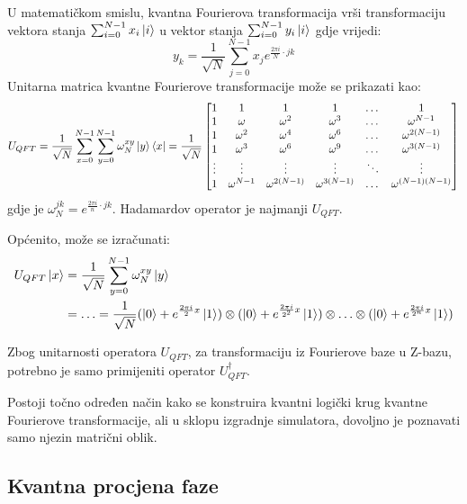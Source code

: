 U matematičkom smislu, kvantna Fourierova transformacija vrši transformaciju vektora stanja $\sum_{i=0}^{N-1}x_i\ket{i}$ u vektor stanja $\sum_{i=0}^{N-1}y_i\ket{i}$ gdje vrijedi:
\begin{equation}
y_k = \frac{1}{\sqrt{N}}\sum_{j=0}^{N-1}x_j e^{\frac{2\pi i}{N}\cdot jk}
\end{equation}
Unitarna matrica kvantne Fourierove transformacije može se prikazati kao:
\begin{equation}
U_{QFT} = \frac{1}{\sqrt{N}}\sum_{x=0}^{N-1}\sum_{y=0}^{N-1}\omega_N^{xy}\ket{y}\bra{x} 
= \frac{1}{\sqrt{N}}\begin{bmatrix}
1 & 1 & 1 & 1 & \dots & 1 \\
1 & \omega & \omega^2 & \omega^3 & \dots & \omega^{N-1} \\
1 & \omega^2 & \omega^4 & \omega^6 & \dots & \omega^{2(N-1)} \\
1 & \omega^3 & \omega^6 & \omega^9 & \dots & \omega^{3(N-1)} \\
\vdots & \vdots & \vdots & \vdots & \ddots & \vdots \\
1 & \omega^{N-1} & \omega^{2(N-1)} & \omega^{3(N-1)} & \dots & \omega^{(N-1)(N-1)} \\
\end{bmatrix}
\end{equation}
gdje je $\omega_N^{jk} = e^{\frac{2\pi i}{n}\cdot jk}$. Hadamardov operator je najmanji $U_{QFT}$.

Općenito, može se izračunati:
\begin{equation}
\begin{aligned}
U_{QFT}\ket{x} &= \frac{1}{\sqrt{N}}\sum_{y=0}^{N-1}\omega_N^{xy}\ket{y} \\
&= \ldots =
\frac{1}{\sqrt{N}}(\ket{0}+e^{\frac{2\pi i}{2}x}\ket{1})\otimes
(\ket{0}+e^{\frac{2\pi i}{2^2}x}\ket{1})\otimes
\ldots \otimes
(\ket{0}+e^{\frac{2\pi i}{2^n}x}\ket{1})
\end{aligned}
\end{equation}

Zbog unitarnosti operatora $U_{QFT}$, za transformaciju iz Fourierove baze u Z-bazu, potrebno je samo primijeniti operator $U_{QFT}^{\dagger}$. 

Postoji točno određen način kako se konstruira kvantni logički krug kvantne Fourierove transformacije, ali u sklopu izgradnje simulatora, dovoljno je poznavati samo njezin matrični oblik.

\subsection{Kvantna procjena faze}

